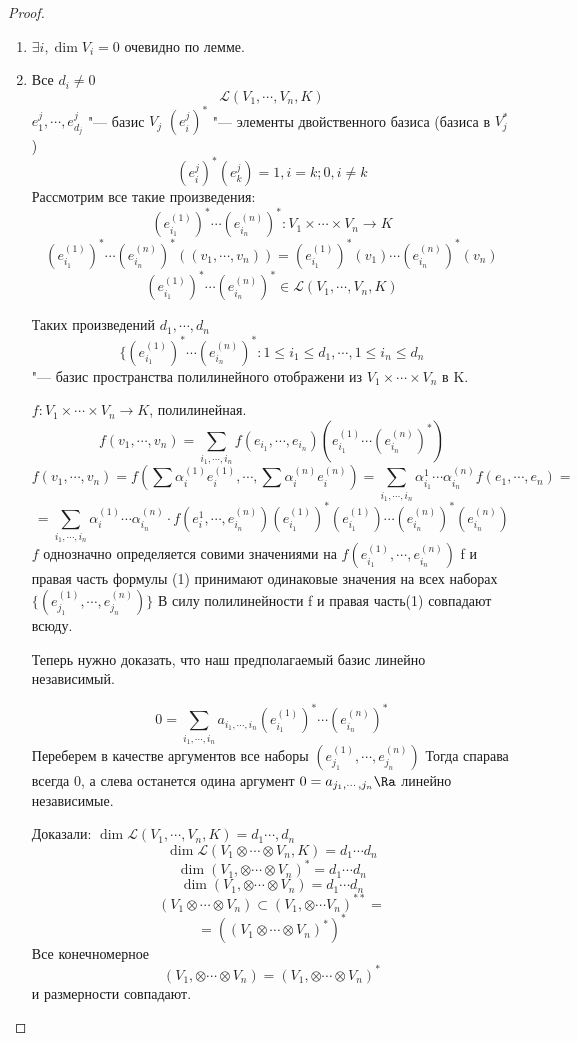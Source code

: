 \begin{proof}
    \begin{enumerate}
    \item $\exists i, \dim V_i = 0$ очевидно по лемме.
    \item Все $d_i \ne 0$
    $$\mathcal{L}(V_1, \cdots, V_n, K)$$
    $e_1^{j}, \cdots, e_{d_j}^j$  "--- базис $V_j$
    $(e_i^j)^*$ "--- элементы двойственного базиса (базиса в $V_j^*$)
    $$(e_i^j)^*(e_{k}^j) =  1, i = k; 0, i \ne k$$
    Рассмотрим все такие произведения:
    $$(e^{(1)}_{i_1})^* \cdots (e_{i_n}^{(n)})^* \colon V_1 \times \cdots \times V_n \to K$$
    $$(e_{i_1}^{(1)})^* \cdots (e^{(n)}_{i_n})^*((v_1, \cdots, v_n)) = (e_{i_1}^{(1)})^*(v_1) \cdots (e_{i_n}^{(n)})^*(v_n)$$
    $$(e_{i_1}^{(1)})^* \cdots (e_{i_n}^{(n)})^* \in \mathcal{L}(V_1, \cdots, V_n, K)$$

    Таких произведений $d_1, \cdots, d_n$ 
    $$\{ (e_{i_1}^{(1)})^* \cdots (e_{i_n}^{(n)})^* \colon 1 \le i_1 \le d_1, \cdots, 1 \le i_n \le d_n$$ "--- базис
    пространства полилинейного отображени из $V_1 \times \cdots \times V_n$ в K.

    $f \colon V_1 \times \cdots \times V_n \to K$, полилинейная. 
    $$f(v_1, \cdots, v_n) = \sum_{i_1, \cdots, i_n}f(e_{i_1}, \cdots, e_{i_n})(e_{i_1}^{(1)} \cdots (e_{i_n}^{(n)})^{*})$$
    $$f(v_1, \cdots, v_n) = f(\sum \alpha_i^{(1)}e_i^{(1)}, \cdots, \sum\alpha_i^{(n)}e_i^{(n)}) = \sum_{i_1, \cdots, i_n}\alpha_{i_1}^{1} \cdots \alpha_{i_n}^{(n)}f(e_1, \cdots, e_n) = $$
    $$= \sum_{i_1, \cdots, i_n} \alpha_i^{(1)} \cdots \alpha_{i_n}^{(n)} \cdot f(e_{i}^{1}, \cdots, e_{i_n}^{(n)})(e_{i_1}^{(1)})^*(e_{i_1}^{(1)}) \cdots (e_{i_n}^{(n)})^*(e_{i_n}^{(n)})$$
    $f$ однозначно определяется совими значениями на $f(e_{i_1}^{(1)}, \cdots, e_{i_n}^{(n)})$
    f и правая часть формулы (1) принимают одинаковые значения на всех наборах $\{(e_{j_1}^{(1)}, \cdots, e_{j_n}^{(n)})\}$
    В силу полилинейности f и правая часть(1) совпадают всюду.
   
    Теперь нужно доказать, что наш предполагаемый базис линейно независимый. 

    $$0 = \sum_{i_1, \cdots, i_n}a_{i_1, \cdots, i_n}(e_{i_1}^{(1)})^* \cdots (e_{i_n}^{(n)})^*$$
    Переберем в качестве аргументов все наборы $(e_{j_1}^{(1)}, \cdots, e_{j_n}^{(n)})$
    Тогда спарава всегда 0, а слева останется одина аргумент
    $0 = a_{j_1, \cdots, j_n} \Ra$  линейно независимые. 

    Доказали: $\dim \mathcal{L}(V_1, \cdots, V_n, K) = d_1 \cdots, d_n$
    $$\dim \mathcal{L}(V_1 \otimes \cdots \otimes V_n, K) = d_1 \cdots d_n$$
    $$\dim (V_1, \otimes \cdots \otimes V_n)^* = d_1 \cdots d_n$$
    $$\dim (V_1, \otimes \cdots \otimes V_n) = d_1 \cdots d_n$$
    $$(V_1 \otimes \cdots \otimes V_n) \subset (V_1, \otimes \cdots V_n)^{**} = $$
    $$= ((V_1 \otimes \cdots \otimes V_n)^*)^*$$
    Все конечномерное 
    $$(V_1, \otimes \cdots \otimes V_n) = (V_1, \otimes \cdots \otimes V_n)^*$$
    и размерности совпадают. 
    \end{enumerate}
\end{proof}

